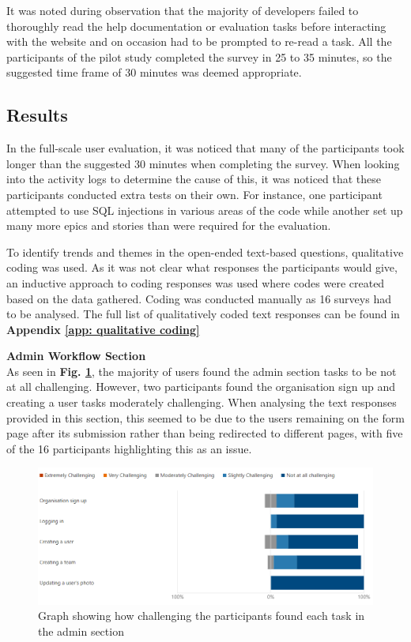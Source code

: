 \documentclass[l4proj.tex]{subfiles}
\begin{document}
It was noted during observation that the majority of developers failed to thoroughly read the help documentation or evaluation tasks before interacting with the website and on occasion had to be prompted to re-read a task. All the participants of the pilot study completed the survey in 25 to 35 minutes, so the suggested time frame of 30 minutes was deemed appropriate.


\subsection{Results}
In the full-scale user evaluation, it was noticed that many of the participants took longer than the suggested 30 minutes when completing the survey. When looking into the activity logs to determine the cause of this, it was noticed that these participants conducted extra tests on their own. For instance, one participant attempted to use SQL injections in various areas of the code while another set up many more epics and stories than were required for the evaluation. 

To identify trends and themes in the open-ended text-based questions, qualitative coding was used. As it was not clear what responses the participants would give, an inductive approach to coding responses was used where codes were created based on the data gathered. Coding was conducted manually as 16 surveys had to be analysed. The full list of qualitatively coded text responses can be found in \textbf{Appendix \ref{app: qualitative coding}}

\textbf{Admin Workflow Section}\\
As seen in \textbf{Fig. \ref{fig:admin task graph}}, the majority of users found the admin section tasks to be not at all challenging. However, two participants found the organisation sign up and creating a user tasks moderately challenging. When analysing the text responses provided in this section, this seemed to be due to the users remaining on the form page after its submission rather than being redirected to different pages, with five of the 16 participants highlighting this as an issue.

\begin{figure}[h!]
\begin{center}
\includegraphics[scale=0.5]{dissertation/images/EvaluationAdminChallengingGraph.png}
\caption{Graph showing how challenging the participants found each task in the admin section}
\label{fig:admin task graph} 
\end{center}
\end{figure}
\end{document}
